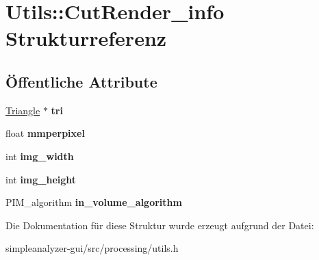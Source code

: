 \hypertarget{structUtils_1_1CutRender__info}{\section{Utils\-:\-:Cut\-Render\-\_\-info Strukturreferenz}
\label{structUtils_1_1CutRender__info}
}
\subsection*{Öffentliche Attribute}
\begin{DoxyCompactItemize}
\item 
\hypertarget{structUtils_1_1CutRender__info_a2998343c733073b317fdd04bd341ce1f}{\hyperlink{classTriangle}{Triangle} $\ast$ {\bfseries tri}}\label{structUtils_1_1CutRender__info_a2998343c733073b317fdd04bd341ce1f}

\item 
\hypertarget{structUtils_1_1CutRender__info_aca49d9537a774906b88f3fd7059d2dcb}{float {\bfseries mmperpixel}}\label{structUtils_1_1CutRender__info_aca49d9537a774906b88f3fd7059d2dcb}

\item 
\hypertarget{structUtils_1_1CutRender__info_ac7a1e2c64129630affaf208808a190eb}{int {\bfseries img\-\_\-width}}\label{structUtils_1_1CutRender__info_ac7a1e2c64129630affaf208808a190eb}

\item 
\hypertarget{structUtils_1_1CutRender__info_abac1c3e4edb7183017ecfa7b69c40d25}{int {\bfseries img\-\_\-height}}\label{structUtils_1_1CutRender__info_abac1c3e4edb7183017ecfa7b69c40d25}

\item 
\hypertarget{structUtils_1_1CutRender__info_af2ee1118ac14a73a2a350a05102013ab}{P\-I\-M\-\_\-algorithm {\bfseries in\-\_\-volume\-\_\-algorithm}}\label{structUtils_1_1CutRender__info_af2ee1118ac14a73a2a350a05102013ab}

\end{DoxyCompactItemize}


Die Dokumentation für diese Struktur wurde erzeugt aufgrund der Datei\-:\begin{DoxyCompactItemize}
\item 
simpleanalyzer-\/gui/src/processing/utils.\-h\end{DoxyCompactItemize}
